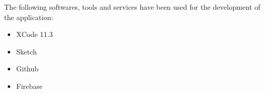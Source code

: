 The following softwares, tools and services have been used for the development of the application:
\vspace{5mm}
\begin{itemize}
\item XCode 11.3
\item Sketch
\item Github
\item Firebase
\end{itemize}
